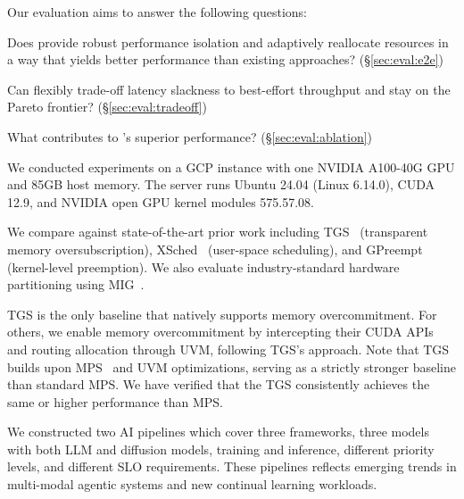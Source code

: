 \label{sec:eval}

Our evaluation aims to answer the following questions:
\squishlist
    \item Does \tool provide robust performance isolation and adaptively reallocate resources in a way that yields better performance than existing approaches? (\S\ref{sec:eval:e2e})
    \item Can \tool flexibly trade-off latency slackness to best-effort throughput and stay on the Pareto frontier? (\S\ref{sec:eval:tradeoff})
    \item What contributes to \tool's superior performance? (\S\ref{sec:eval:ablation})
\squishend


We conducted experiments on a GCP instance with one NVIDIA A100-40G GPU and 85GB host memory. The server runs Ubuntu 24.04 (Linux 6.14.0), CUDA 12.9, and NVIDIA open GPU kernel modules 575.57.08.

We compare \tool against state-of-the-art prior work including TGS~\cite{tgs@nsdi23} (transparent memory oversubscription), XSched~\cite{xsched@osdi25} (user-space scheduling), and GPreempt~\cite{gpreempt@atc25} (kernel-level preemption). We also evaluate industry-standard hardware partitioning using MIG~\cite{nvidiaMIG}.

TGS is the only baseline that natively supports memory overcommitment. For others, we enable memory overcommitment by intercepting their CUDA APIs and routing allocation through UVM, following TGS's approach.
Note that TGS builds upon MPS~\cite{nvidiaMPS} and UVM optimizations, serving as a strictly stronger baseline than standard MPS. We have verified that the TGS consistently achieves the same or higher performance than MPS. 




We constructed two AI pipelines which cover three frameworks, three models with both LLM and diffusion models, training and inference, different priority levels, and different SLO requirements. 
These pipelines reflects emerging trends in multi-modal agentic systems and new continual learning workloads. 

